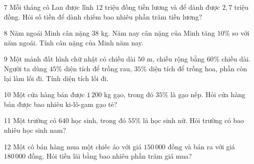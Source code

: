 \gap
\begin{probbox}{7}{\relax}
Mỗi tháng cô Lan được lĩnh $12$ triệu đồng tiền lương và để dành được $2{,}7$ triệu đồng. Hỏi số tiền để dành chiếm bao nhiêu phần trăm tiền lương?
\end{probbox}
\gap
\begin{probbox}{8}{\relax}
Năm ngoái Minh cân nặng $38$ kg. Năm nay cân nặng của Minh tăng $10\%$ so với năm ngoái. Tính cân nặng của Minh năm nay.
\end{probbox}
\gap
\begin{probbox}{9}{\relax}
Một mảnh đất hình chữ nhật có chiều dài $50$ m, chiều rộng bằng $60\%$ chiều dài. Người ta dùng $45\%$ diện tích để trồng rau, $35\%$ diện tích để trồng hoa, phần còn lại làm lối đi. Tính diện tích lối đi.
\end{probbox}
\gap
\begin{probbox}{10}{\relax}
Một cửa hàng bán được $1\,200$ kg gạo, trong đó $35\%$ là gạo nếp. Hỏi cửa hàng bán được bao nhiêu ki-lô-gam gạo tẻ?
\end{probbox}
\gap
\begin{probbox}{11}{\relax}
Một trường có $640$ học sinh, trong đó $55\%$ là học sinh nữ. Hỏi trường có bao nhiêu học sinh nam?
\end{probbox}
\gap
\begin{probbox}{12}{\relax}
Một cô bán hàng mua một chiếc áo với giá $150\,000$ đồng và bán ra với giá $180\,000$ đồng. Hỏi tiền lãi bằng bao nhiêu phần trăm giá mua?
\end{probbox}
